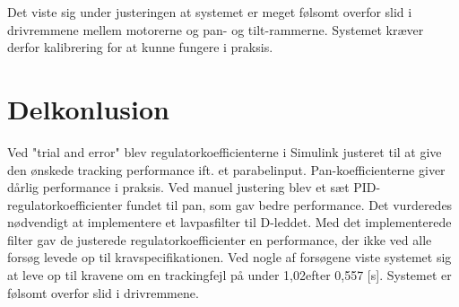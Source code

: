 
%
%

Det viste sig under justeringen at systemet er meget følsomt overfor slid i drivremmene mellem motorerne og pan- og tilt-rammerne.
Systemet kræver derfor kalibrering for at kunne fungere i praksis.

\section{Delkonlusion}
Ved "trial and error" blev regulatorkoefficienterne i Simulink justeret til at give den ønskede 
tracking performance ift. et parabelinput. Pan-koefficienterne giver dårlig performance i praksis.
Ved manuel justering blev et sæt PID-regulatorkoefficienter fundet til pan, som gav bedre performance.
Det vurderedes nødvendigt at implementere et lavpasfilter til D-leddet.
Med det implementerede filter gav de justerede regulatorkoefficienter en performance,
der ikke ved alle forsøg levede op til kravspecifikationen. Ved nogle af forsøgene viste
systemet sig at leve op til kravene om en trackingfejl på under 1,02\degree efter 0,557 [s].
Systemet er følsomt overfor slid i drivremmene.
